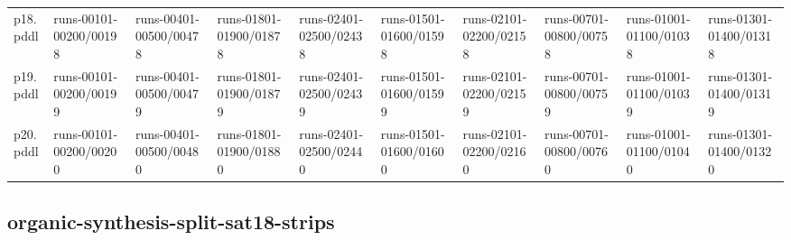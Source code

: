 \documentclass{article}
\begin{document}
\begin{tabular}{@{}lrrrrrrrrr@{}}
p18.pddl & \multicolumn{1}{|l|}{runs-00101-00200/00198} & \multicolumn{1}{|l|}{runs-00401-00500/00478} & \multicolumn{1}{|l|}{runs-01801-01900/01878} & \multicolumn{1}{|l|}{runs-02401-02500/02438} & \multicolumn{1}{|l|}{runs-01501-01600/01598} & \multicolumn{1}{|l|}{runs-02101-02200/02158} & \multicolumn{1}{|l|}{runs-00701-00800/00758} & \multicolumn{1}{|l|}{runs-01001-01100/01038} & \multicolumn{1}{|l|}{runs-01301-01400/01318} \\
p19.pddl & \multicolumn{1}{|l|}{runs-00101-00200/00199} & \multicolumn{1}{|l|}{runs-00401-00500/00479} & \multicolumn{1}{|l|}{runs-01801-01900/01879} & \multicolumn{1}{|l|}{runs-02401-02500/02439} & \multicolumn{1}{|l|}{runs-01501-01600/01599} & \multicolumn{1}{|l|}{runs-02101-02200/02159} & \multicolumn{1}{|l|}{runs-00701-00800/00759} & \multicolumn{1}{|l|}{runs-01001-01100/01039} & \multicolumn{1}{|l|}{runs-01301-01400/01319} \\
p20.pddl & \multicolumn{1}{|l|}{runs-00101-00200/00200} & \multicolumn{1}{|l|}{runs-00401-00500/00480} & \multicolumn{1}{|l|}{runs-01801-01900/01880} & \multicolumn{1}{|l|}{runs-02401-02500/02440} & \multicolumn{1}{|l|}{runs-01501-01600/01600} & \multicolumn{1}{|l|}{runs-02101-02200/02160} & \multicolumn{1}{|l|}{runs-00701-00800/00760} & \multicolumn{1}{|l|}{runs-01001-01100/01040} & \multicolumn{1}{|l|}{runs-01301-01400/01320} \\
\end{tabular}

\hypertarget{run_dir-organic-synthesis-split-sat18-strips}{}
\subsection*{organic-synthesis-split-sat18-strips}
\end{document}

